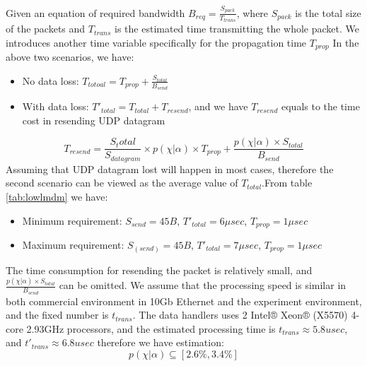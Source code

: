\documentclass[11pt,openright,a4paper]{report}
\begin{document}
Given an equation of required bandwidth $B_{req}=\frac{S_{pack}}{T_{trans}}$, where $S_{pack}$ is the total size of the packets and $T_{trans}$ is the estimated time transmitting the whole packet. We introduces another time variable specifically for the propagation time $T_{prop}$ In the above two scenarios, we have:
\begin{itemize}
	\item No data loss: $T_{totoal}=T_{prop}+\frac{S_{total}}{B_{send}}$
	\item With data loss: ${T}'_{total}=T_{total}+T_{resend}$, and we have $T_{resend}$ equals to the time cost in resending UDP datagram
\end{itemize}
\begin{equation}
T_{resend}=\frac{S_total}{S_{datagram}}\times p(\chi|\alpha) \times T_{prop} + \frac{p(\chi | \alpha) \times S_{total}}{B_{send}}
\end{equation}
Assuming that UDP datagram lost will happen in most cases, therefore the second scenario can be viewed as the average value of $T_{total}.$From table \ref{tab:lowlmdm} we have:
\begin{itemize}
	\item Minimum requirement: $S_{send}=45B$, ${T}'_{total}=6\mu sec$, $T_{prop}=1\mu sec$
	\item Maximum requirement: $S_(send)=45B$, ${T}'_{total}=7\mu sec$, $T_{prop}=1\mu sec$
\end{itemize} 
The time consumption for resending the packet is relatively small, and $\frac{p(\chi | \alpha) \times S_{total}}{B_{send}}$ can be omitted. We assume that the processing speed is similar in both commercial environment in 10Gb Ethernet and the experiment environment, and the fixed number is $t_{trans}$. The data handlers uses 2 Intel® Xeon® (X5570) 4-core 2.93GHz processors\cite{ibm2011highfrequency}, and the estimated processing time is $t_{trans} \approx 5.8usec$, and ${t}'_{trans} \approx 6.8usec$ therefore we have estimation: 
\begin{equation}
	p(\chi | \alpha) \subseteq [2.6\%, 3.4\%] 
\end{equation}
\end{document}

